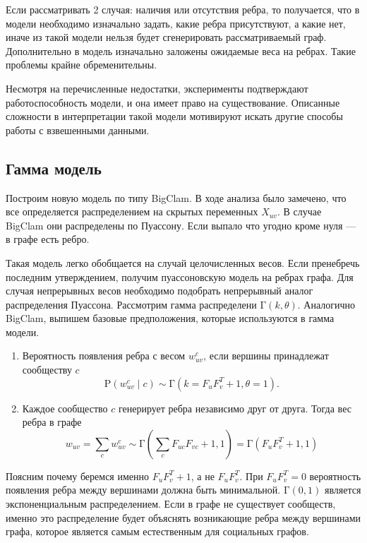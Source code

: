 \documentclass{ITaSconf}
\def\PP{\mathrm{P}}
\begin{document}
Если рассматривать 2 случая: наличия или отсутствия ребра, то получается, что в модели необходимо изначально задать, какие ребра присутствуют, а какие нет, иначе из такой модели нельзя будет сгенерировать рассматриваемый граф. 
Дополнительно в модель изначально заложены ожидаемые веса на ребрах. 
Такие проблемы крайне обременительны.

Несмотря на перечисленные недостатки, эксперименты подтверждают работоспособность модели, и она имеет право на существование.
Описанные сложности в интерпретации такой модели мотивируют искать другие способы работы с взвешенными данными.

\subsection{Гамма модель}

Построим новую модель по типу BigClam. 
В ходе анализа было замечено, что все определяется распределением на скрытых переменных $X_{uv}$. 
В случае BigClam они распределены по Пуассону. 
Если выпало что угодно кроме нуля --- в графе есть ребро. 

Такая модель легко обобщается на случай целочисленных весов. 
Если пренебречь последним утверждением, получим пуассоновскую модель на ребрах графа. 
Для случая непрерывных весов необходимо подобрать непрерывный аналог распределения Пуассона.  
Рассмотрим гамма распределени $\mathrm{\Gamma}(k, \theta)$.
Аналогично BigClam, выпишем базовые предположения, которые используются в гамма модели.

\begin{enumerate}
	\item Вероятность появления ребра с весом $w^{c}_{uv}$, если вершины принадлежат сообществу $c$
	$$\PP\left(w^{c}_{uv} \mid c\right) \sim \mathrm{\Gamma}\left(k=F_u F_v^T + 1, \theta=1\right).$$
	\item Каждое сообщество $c$ генерирует ребра независимо друг от друга. Тогда вес ребра в графе
	$$w_{uv} = \sum_{c} w_{uv}^c \sim \mathrm{\Gamma}\left(\sum_c F_{uc} F_{vc} + 1, 1\right) = \mathrm{\Gamma}\left(F_u F_v^T + 1, 1\right)$$
\end{enumerate}

Поясним почему беремся именно $F_u F_v^T + 1$, а не $F_u F_v^T$.
При $F_u F_v^T=0$ вероятность появления ребра между вершинами должна быть минимальной. 
$\mathrm{\Gamma}(0, 1)$ является экспоненциальным распределением. 
Если в графе не существует сообществ, именно это распределение будет объяснять возникающие ребра между вершинами графа, которое является самым естественным для социальных графов.
\end{document}
